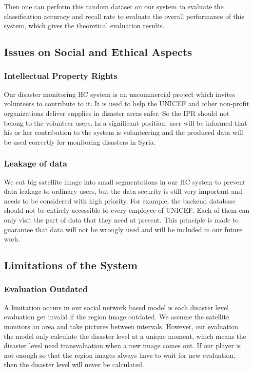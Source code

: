 Then one can perform this random dataset on our system to evaluate the classification accuracy and recall rate to
evaluate the overall performance of this system, which gives the theoretical evaluation results.

\subsection{Issues on Social and Ethical Aspects}

\subsubsection{Intellectual Property Rights}
Our disaster monitoring HC system is an uncommercial project which invites volunteers to contribute to it. 
It is used to help the UNICEF and other non-profit organizations deliver supplies in disaster areas safer. 
So the IPR should not belong to the volunteer users. In a significant position, user will be informed that 
his or her contribution to the system is volunteering and the produced data will be used correctly for 
monitoring disasters in Syria.

\subsubsection{Leakage of data}
We cut big satellite image into small segmentations in our HC system to prevent data leakage to ordinary users, 
but the data security is still very important and needs to be considered with high priority. For example, 
the backend database should not be entirely accessible to every employee of UNICEF. 
Each of them can only visit the part of data that they need at present. This principle is made to guarantee 
that data will not be wrongly used and will be included in our future work.

\subsection{Limitations of the System}

\subsubsection{Evaluation Outdated}

A limitation occurs in our social network based model is each disaster level evaluation get invalid 
if the region image outdated. 
We assume the satellite monitors an area and take pictures between intervals. However, our evaluation
the model only calculate the disaster level at a unique moment, which means the disaster level need 
transvaluation when a new image comes out.
If our player is not enough so that the region images always have to wait for new evaluation, then the
disaster level will never be calculated.

